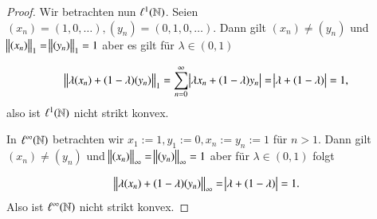 \begin{proof}
  Wir betrachten nun $\ell^1(\mathbb{N})$. Seien $(x_n)=(1,0,\dots), (y_n)=(0,1,0,\dots)$. Dann gilt $(x_n) \neq (y_n)$ und $\norm{(x_n)}_1=\norm{(y_n)}_1=1$ aber es gilt für $\lambda \in (0,1)$

  \begin{equation*}
    \norm{\lambda(x_n)+(1-\lambda)(y_n)}_1 = \sum_{n=0}^\infty{\abs{\lambda x_n+(1-\lambda)y_n}}=\abs{\lambda + (1-\lambda)} = 1,
  \end{equation*}
  also ist $\ell^1(\mathbb{N})$ nicht strikt konvex.

  In $\ell^\infty(\mathbb{N})$ betrachten wir $x_1:=1, y_1:=0, x_n:=y_n:=1$ für $n>1$. Dann gilt $(x_n) \neq (y_n)$ und $\norm{(x_n)}_\infty=\norm{(y_n)}_\infty=1$ aber für $\lambda \in (0,1)$ folgt

  \begin{equation*}
    \norm{\lambda(x_n)+ (1-\lambda)(y_n)}_\infty=\abs{\lambda + (1 - \lambda)}=1.
  \end{equation*}
  Also ist $\ell^\infty(\mathbb{N})$ nicht strikt konvex.
\end{proof}
